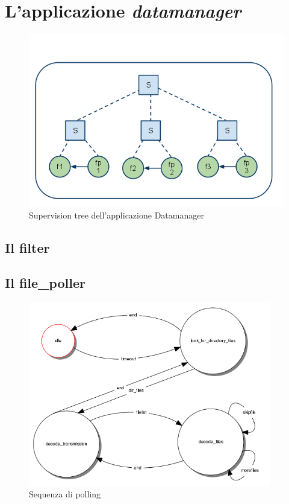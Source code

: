 %
\section{L'applicazione \emph{datamanager}}
%
\begin{figure}[!h]
\centering
\includegraphics[width=380pt]{img/datamanager.png}
\caption{Supervision tree dell'applicazione Datamanager}
\end{figure}
%
\subsection{Il filter}
\subsection{Il file\_poller}
%
\begin{figure}[!h]
\centering
\includegraphics[width=300pt]{img/file-poller.png}
\caption{Sequenza di polling}
\end{figure}
%
